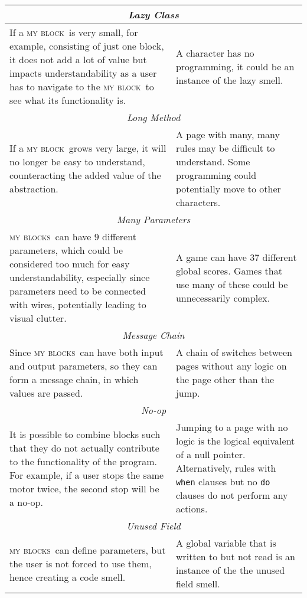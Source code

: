 \documentclass[conference]{IEEEtran}
\newcommand{\mbs}{\textsc{my blocks}}
\newcommand{\mb}{\textsc{my block}}
\begin{document}
\begin{table*}
\begin{tabular}{ p{3.38in}  p{3.37in} }
\multicolumn{2}{c}{ \emph{Lazy Class}} \\ \hline
If a \mb~is very small, for example, consisting of just one block, it does not add a lot of value but impacts understandability as a user has to navigate to the \mb~to see what its functionality is. 
& A character has no programming, it could be an instance of the lazy smell. \\ \bottomrule
\multicolumn{2}{c}{ \emph{Long Method}} \\ \hline
 If a \mb~grows very large, it will no longer be easy to understand, counteracting the added value of the abstraction. & A page with many, many rules may be difficult to understand. Some programming could potentially move to other characters.\\ \bottomrule
\multicolumn{2}{c}{ \emph{Many Parameters}} \\ \hline
 \mbs~can have 9 different parameters, which could be considered too much for easy understandability, especially since parameters need to be connected with wires, potentially leading to visual clutter. 
 & A game can have 37 different global scores. Games that use many of these could be unnecessarily complex.\\ \bottomrule
\multicolumn{2}{c}{ \emph{Message Chain}} \\ \hline
Since \mbs~can have both input and output parameters, so they can form a message chain, in which values are passed. 
& A chain of switches between pages without any logic on the page other than the jump. \\ \bottomrule
\multicolumn{2}{c}{ \emph{No-op}} \\ \hline 
 It is possible to combine blocks such that they do not actually contribute to the functionality of the program. For example, if a user stops the same motor twice, the second stop will be a no-op.
 & Jumping to a page with no logic is the logical equivalent of a null pointer. 
 Alternatively, rules with {\tt when} clauses but no {\tt do} clauses do not perform any actions.\\ \bottomrule
\multicolumn{2}{c}{ \emph{Unused Field}} \\ \hline
 \mbs~can define parameters, but the user is not forced to use them, hence creating a code smell.
 & A global variable that is written to but not read is an instance of the the unused field smell.\\ \bottomrule
\end{tabular}
\end{table*}
\end{document}
